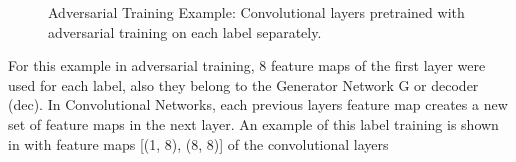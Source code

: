 \begin{figure}[!ht]
  \centering
    \quad
  \caption{Adversarial Training Example: Convolutional layers pretrained with adversarial training on each label separately.}
  \label{fig:nn_adv_example}
\end{figure}
\FloatBarrier
\noindent

For this example in adversarial training, 8 feature maps of the first layer were used for each label, also they belong to the Generator Network G or decoder (dec). In Convolutional Networks, each previous layers feature map creates a new set of feature maps in the next layer.
An example of this label training is shown in  with feature maps [(1, 8), (8, 8)] of the convolutional layers

